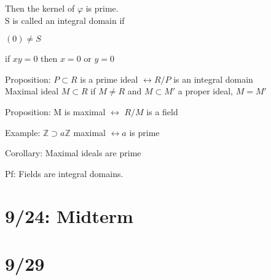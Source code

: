 \documentclass[12pt]{article}
\begin{document}
Then the kernel of $\varphi$ is prime.\\

\noindent
S is called an integral domain if 

$(0) \neq S$

if $xy = 0$ then $x = 0$ or $y = 0$

\noindent
Proposition: $P \subset R$ is a prime ideal $\leftrightarrow R/P$ is an integral domain\\

\noindent
Maximal ideal $M \subset R$ if $M \neq R$ and $M \subset M'$ a proper ideal, $M = M'$

\noindent
Proposition: M is maximal $\leftrightarrow$ $R/M$ is a field

\noindent
Example: $\mathds{Z} \supset a\mathds{Z}$ maximal $\leftrightarrow a$ is prime

\noindent
Corollary: Maximal ideals are prime

Pf: Fields are integral domains.

\section{9/24: Midterm}

\section{9/29}
\end{document}
